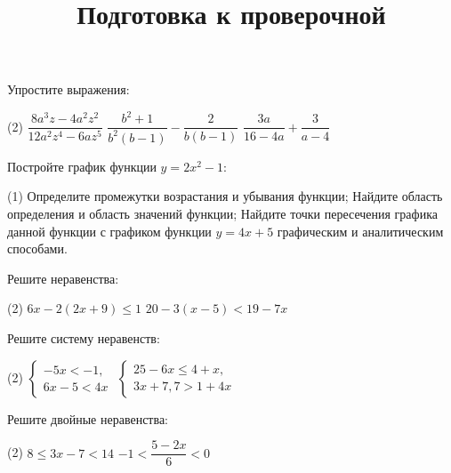 \begin{class}[number=7]
	\title{Подготовка к проверочной}
	\begin{listofex}
		\item Упростите выражения:
		\begin{tasks}(2)
			\task \( \dfrac{8a^3z-4a^2z^2}{12a^2z^4-6az^5} \)
			\task \( \dfrac{b^2+1}{b^2(b-1)}-\dfrac{2}{b(b-1)} \)
			\task \( \dfrac{3a}{16-4a}+\dfrac{3}{a-4} \)
		\end{tasks}
		\item Постройте график функции \( y=2x^2-1 \):
		\begin{tasks}(1)
			\task Определите промежутки возрастания и убывания функции;
			\task Найдите область определения и область значений функции;
			\task Найдите точки пересечения графика данной функции с графиком функции \( y=4x+5 \) графическим и аналитическим способами.
		\end{tasks}
		\item Решите неравенства:
		\begin{tasks}(2)
			\task \( 6x-2(2x+9)\leq1 \)
			\task \( 20-3(x-5)<19-7x \)
		\end{tasks}
		\item Решите систему неравенств:
		\begin{tasks}(2)
			\task \( \left\{
			\begin{array}{l}
				-5x<-1,\\
				6x-5<4x
			\end{array}
			\right. \)
			\task \( \left\{
			\begin{array}{l}
				25-6x\leq4+x,\\
				3x+7,7>1+4x
			\end{array}
			\right. \)
		\end{tasks}
		\item Решите двойные неравенства:
		\begin{tasks}(2)
			\task \( 8\leq3x-7<14 \)
			\task \( -1<\dfrac{5-2x}{6}<0 \)
		\end{tasks}
	\end{listofex}
\end{class}

